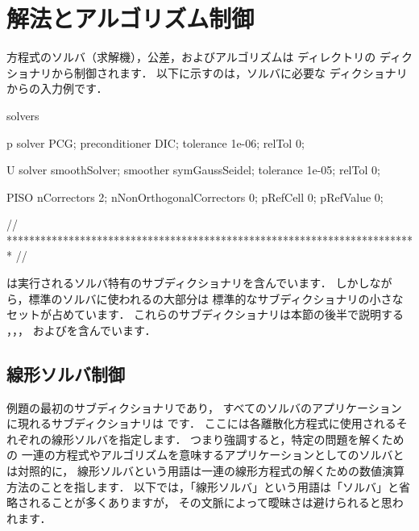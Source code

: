 \section{解法とアルゴリズム制御}
\label{sec:4.5}
方程式のソルバ（求解機），公差，およびアルゴリズムは
ディレクトリの
%
%
ディクショナリから制御されます．
以下に示すのは，ソルバに必要な
ディクショナリからの入力例です．
\begin{OFverbatim}[file, linenum=17]

solvers
{
    p
    {
        solver           PCG;
        preconditioner   DIC;
        tolerance        1e-06;
        relTol           0;
    }

    U
    {
        solver           smoothSolver;
        smoother         symGaussSeidel;
        tolerance        1e-05;
        relTol           0;
    }
}

PISO
{
    nCorrectors     2;
    nNonOrthogonalCorrectors 0;
    pRefCell        0;
    pRefValue       0;
}


// ************************************************************************* //
\end{OFverbatim}%
\label{p:U-117}%
は実行されるソルバ特有のサブディクショナリを含んでいます．
しかしながら，標準のソルバに使われるの大部分は
標準的なサブディクショナリの小さなセットが占めています．
これらのサブディクショナリは本節の後半で説明する
，，，
およびを含んでいます．


\subsection{線形ソルバ制御}
\label{ssec:4.5.1}
例題の最初のサブディクショナリであり，
すべてのソルバのアプリケーションに現れるサブディクショナリは
%
%
です．
ここには各離散化方程式に使用されるそれぞれの線形ソルバを指定します．
つまり強調すると，特定の問題を解くための
一連の方程式やアルゴリズムを意味するアプリケーションとしてのソルバとは対照的に，
線形ソルバという用語は一連の線形方程式の解くための数値演算方法のことを指します．
以下では，「線形ソルバ」という用語は「ソルバ」と省略されることが多くありますが，
その文脈によって曖昧さは避けられると思われます．

